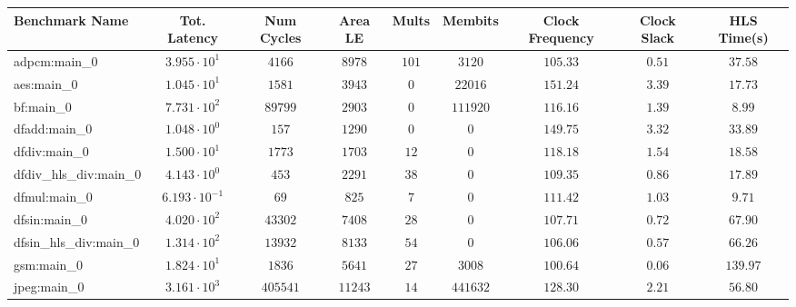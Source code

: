 \begin{tabular}{|l|c|c|c|c|c|c|c|c|}
\hline
Benchmark Name          & Tot. Latency            & Num Cycles & Area LE   & Mults   & Membits    & Clock Frequency & Clock Slack & HLS Time(s) \\
\hline
adpcm:main\_0           & $ 3.955 \cdot 10^{1}  $ & $ 4166   $ & $ 8978  $ & $ 101 $ & $ 3120   $ & $ 105.33      $ & $ 0.51    $ & $ 37.58   $ \\
aes:main\_0             & $ 1.045 \cdot 10^{1}  $ & $ 1581   $ & $ 3943  $ & $ 0   $ & $ 22016  $ & $ 151.24      $ & $ 3.39    $ & $ 17.73   $ \\
bf:main\_0              & $ 7.731 \cdot 10^{2}  $ & $ 89799  $ & $ 2903  $ & $ 0   $ & $ 111920 $ & $ 116.16      $ & $ 1.39    $ & $ 8.99    $ \\
dfadd:main\_0           & $ 1.048 \cdot 10^{0}  $ & $ 157    $ & $ 1290  $ & $ 0   $ & $ 0      $ & $ 149.75      $ & $ 3.32    $ & $ 33.89   $ \\
dfdiv:main\_0           & $ 1.500 \cdot 10^{1}  $ & $ 1773   $ & $ 1703  $ & $ 12  $ & $ 0      $ & $ 118.18      $ & $ 1.54    $ & $ 18.58   $ \\
dfdiv\_hls\_div:main\_0 & $ 4.143 \cdot 10^{0}  $ & $ 453    $ & $ 2291  $ & $ 38  $ & $ 0      $ & $ 109.35      $ & $ 0.86    $ & $ 17.89   $ \\
dfmul:main\_0           & $ 6.193 \cdot 10^{-1} $ & $ 69     $ & $ 825   $ & $ 7   $ & $ 0      $ & $ 111.42      $ & $ 1.03    $ & $ 9.71    $ \\
dfsin:main\_0           & $ 4.020 \cdot 10^{2}  $ & $ 43302  $ & $ 7408  $ & $ 28  $ & $ 0      $ & $ 107.71      $ & $ 0.72    $ & $ 67.90   $ \\
dfsin\_hls\_div:main\_0 & $ 1.314 \cdot 10^{2}  $ & $ 13932  $ & $ 8133  $ & $ 54  $ & $ 0      $ & $ 106.06      $ & $ 0.57    $ & $ 66.26   $ \\
gsm:main\_0             & $ 1.824 \cdot 10^{1}  $ & $ 1836   $ & $ 5641  $ & $ 27  $ & $ 3008   $ & $ 100.64      $ & $ 0.06    $ & $ 139.97  $ \\
jpeg:main\_0            & $ 3.161 \cdot 10^{3}  $ & $ 405541 $ & $ 11243 $ & $ 14  $ & $ 441632 $ & $ 128.30      $ & $ 2.21    $ & $ 56.80   $ \\

\end{tabular}
